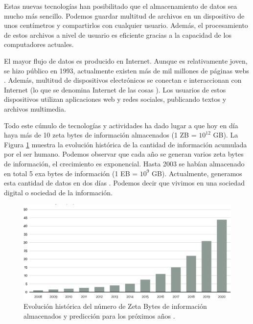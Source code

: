 \documentclass[10pt]{article}
\begin{document}
	Estas nuevas tecnologías han posibilitado que el almacenamiento de datos sea mucho más sencillo. Podemos guardar multitud de archivos en un dispositivo de unos centímetros y compartirlos con cualquier usuario. Además, el procesamiento de estos archivos a nivel de usuario es eficiente gracias a la capacidad de los computadores actuales. 
	
	El mayor flujo de datos es producido en Internet. Aunque es relativamente joven, se hizo público en 1993, actualmente existen más de mil millones de páginas webs \cite{internet}. Además, multitud de dispositivos electrónicos se conectan e interaccionan con Internet (lo que se denomina Internet de las cosas \cite{big-data-internet-cosas}). Los usuarios de estos dispositivos utilizan aplicaciones web y redes sociales, publicando textos y archivos multimedia. 
	
	Todo este cúmulo de tecnologías y actividades ha dado lugar a que hoy en día haya más de 10 zeta bytes de información almacenados (1 ZB = $10^{12}$ GB). La Figura \ref{fig:zeta-bytes} muestra la evolución histórica de la cantidad de información acumulada por el ser humano. Podemos observar que cada año se generan varios zeta bytes de información, el crecimiento es exponencial. Hasta 2003 se habían almacenado en total 5 exa bytes de información (1 EB = $10^9$ GB). Actualmente, generamos esta cantidad de datos en dos días \cite{big-data}. Podemos decir que vivimos en una sociedad digital o sociedad de la información.

	\begin{figure}[H]
	       	\centering
	       	\includegraphics[width=14cm]{./images/Data.png}
	       	\caption{Evolución histórica del número de Zeta Bytes de información almacenados y predicción para los próximos años \cite{zeta-bytes}.} 
	       	\label{fig:zeta-bytes}
	 \end{figure}
\end{document}
